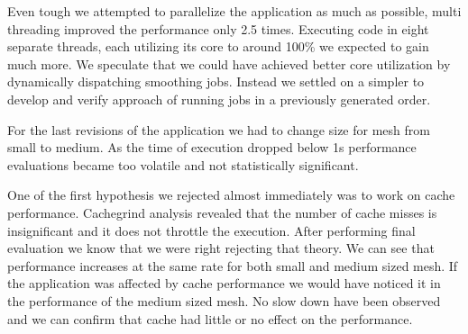\documentclass[conference]{IEEEtran}
\begin{document}
Even tough we attempted to parallelize the application as much as possible, multi threading improved the performance only 2.5 times. Executing code in eight separate threads, each utilizing its core to around 100\% we expected to gain much more. We speculate that we could have achieved better core utilization by dynamically dispatching smoothing jobs. Instead we settled on a simpler to develop and verify approach of running jobs in a previously generated order.

For the last revisions of the application we had to change size for mesh from small to medium. As the time of execution dropped below 1s performance evaluations became too volatile and not statistically significant.


One of the first hypothesis we rejected almost immediately was to work on cache performance. Cachegrind analysis revealed that the number of cache misses is insignificant and it does not throttle the execution. After performing final evaluation we know that we were right rejecting that theory. We can see that performance increases at the same rate for both small and medium sized mesh. If the application was affected by cache performance we would have noticed it in the performance of the medium sized mesh. No slow down have been observed and we can confirm that cache had little or no effect on the performance.

\end{document}
